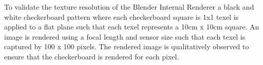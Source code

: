 To validate the texture resolution of the Blender Internal Renderer a black and white checkerboard pattern where each checkerboard square is 1x1 texel is applied to a flat plane such that each texel represents a 10cm x 10cm square.  An image is rendered using a focal length and sensor size such that each texel is captured by 100 x 100 pixels.  The rendered image is qualitatively observed to ensure that the checkerboard is rendered for each pixel.   


